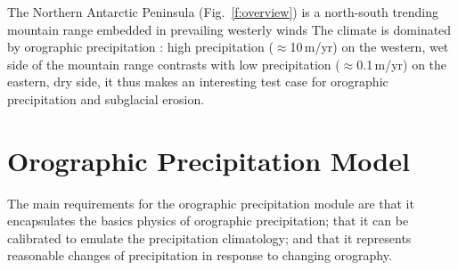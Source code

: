 \documentclass[11pt]{article}
\begin{document}
The Northern Antarctic Peninsula (Fig.~\ref{f:overview}) is a north-south trending mountain range embedded in prevailing westerly winds The climate is dominated by orographic precipitation \citep[Fig.~\ref{f:overview}D and][]{Simmonds2003}: high precipitation ($\approx$10\,m/yr) on the western, wet side of the mountain range contrasts with low precipitation ($\approx$0.1\,m/yr) on the eastern, dry side, it thus makes an interesting test case for orographic precipitation and subglacial erosion.

\section{Orographic Precipitation Model}

The main requirements for the orographic precipitation module are that it encapsulates the basics physics of orographic precipitation; that it can be calibrated to emulate the precipitation climatology; and that it represents reasonable changes of precipitation in response to changing orography. 
\end{document}

